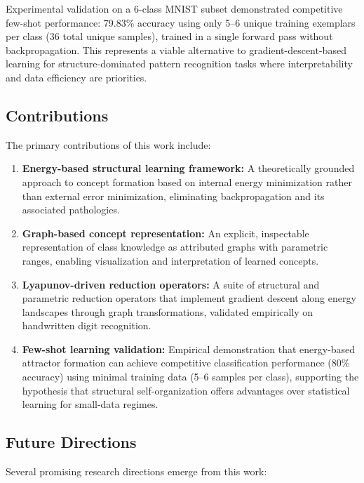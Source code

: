 \documentclass[12pt, a4paper]{article}
\begin{document}
Experimental validation on a 6-class MNIST subset demonstrated competitive few-shot performance: 79.83\% accuracy using only 5--6 unique training exemplars per class (36 total unique samples), trained in a single forward pass without backpropagation. This represents a viable alternative to gradient-descent-based learning for structure-dominated pattern recognition tasks where interpretability and data efficiency are priorities.

\subsection{Contributions}

The primary contributions of this work include:

\begin{enumerate}
\item \textbf{Energy-based structural learning framework:} A theoretically grounded approach to concept formation based on internal energy minimization rather than external error minimization, eliminating backpropagation and its associated pathologies.

\item \textbf{Graph-based concept representation:} An explicit, inspectable representation of class knowledge as attributed graphs with parametric ranges, enabling visualization and interpretation of learned concepts.

\item \textbf{Lyapunov-driven reduction operators:} A suite of structural and parametric reduction operators that implement gradient descent along energy landscapes through graph transformations, validated empirically on handwritten digit recognition.

\item \textbf{Few-shot learning validation:} Empirical demonstration that energy-based attractor formation can achieve competitive classification performance (80\% accuracy) using minimal training data (5--6 samples per class), supporting the hypothesis that structural self-organization offers advantages over statistical learning for small-data regimes.
\end{enumerate}

\subsection{Future Directions}

Several promising research directions emerge from this work:
\end{document}
